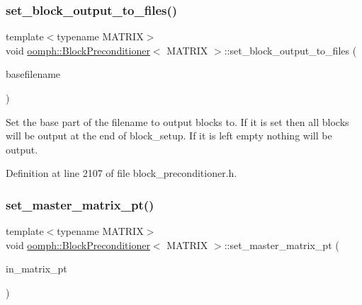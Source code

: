\mbox{\label{classoomph_1_1BlockPreconditioner_ab36e905f7da268328709d62951d64ace}} 
\subsubsection{\texorpdfstring{set\+\_\+block\+\_\+output\+\_\+to\+\_\+files()}{set\_block\_output\_to\_files()}}
{\footnotesize\ttfamily template$<$typename M\+A\+T\+R\+IX$>$ \\
void \hyperlink{classoomph_1_1BlockPreconditioner}{oomph\+::\+Block\+Preconditioner}$<$ M\+A\+T\+R\+IX $>$\+::set\+\_\+block\+\_\+output\+\_\+to\+\_\+files (\begin{DoxyParamCaption}\item[{const std\+::string \&}]{basefilename }\end{DoxyParamCaption})\hspace{0.3cm}{\ttfamily [inline]}}



Set the base part of the filename to output blocks to. If it is set then all blocks will be output at the end of block\+\_\+setup. If it is left empty nothing will be output. 



Definition at line 2107 of file block\+\_\+preconditioner.\+h.

\mbox{\label{classoomph_1_1BlockPreconditioner_a748e2ad8836bc8edf5b9a42373a7ad61}} 
\subsubsection{\texorpdfstring{set\+\_\+master\+\_\+matrix\+\_\+pt()}{set\_master\_matrix\_pt()}}
{\footnotesize\ttfamily template$<$typename M\+A\+T\+R\+IX$>$ \\
void \hyperlink{classoomph_1_1BlockPreconditioner}{oomph\+::\+Block\+Preconditioner}$<$ M\+A\+T\+R\+IX $>$\+::set\+\_\+master\+\_\+matrix\+\_\+pt (\begin{DoxyParamCaption}\item[{M\+A\+T\+R\+IX $\ast$}]{in\+\_\+matrix\+\_\+pt }\end{DoxyParamCaption})\hspace{0.3cm}{\ttfamily [inline]}}



